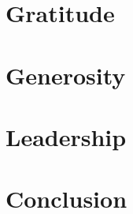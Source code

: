 \documentclass{book}
\begin{document}
\chapter{Gratitude}


\chapter{Generosity}


\chapter{Leadership}


\chapter{Conclusion}






\printindex
\end{document}
